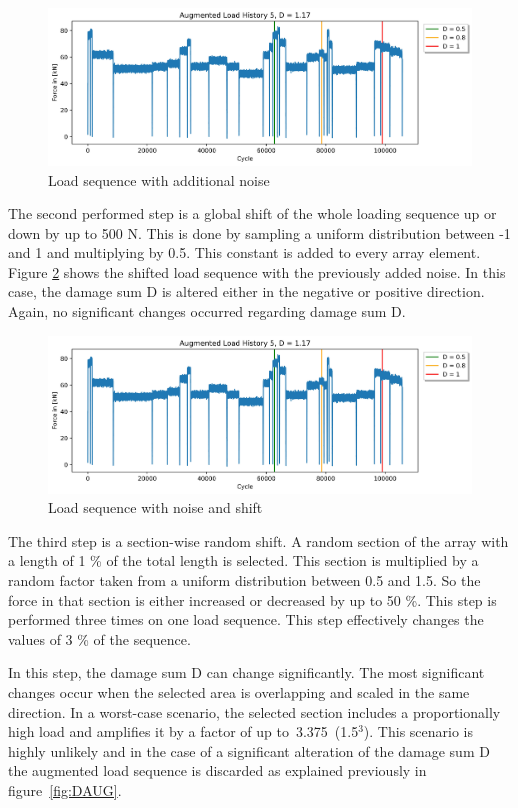 \begin{figure}[H]
	\centering
	\includegraphics[width=1\linewidth]{IMGs/Verlauf_5_noise.jpg}
	\caption{Load sequence with additional noise}
	\label{fig:V5_noise}
\end{figure}

The second performed step is a global shift of the whole loading sequence up or down by up to 500 N. This is done by sampling a uniform distribution between -1 and 1 and multiplying by 0.5. This constant is added to every array element. Figure \ref{fig:V5_shift} shows the shifted load sequence with the previously added noise. In this case, the damage sum D is altered either in the negative or positive direction. Again, no significant changes occurred regarding damage sum D.

\begin{figure}[H]
	\centering
	\includegraphics[width=1\linewidth]{IMGs/Verlauf_5_noise.jpg}
	\caption{Load sequence with noise and shift}
	\label{fig:V5_shift}
\end{figure}

The third step is a section-wise random shift. A random section of the array with a length of 1 \% of the total length is selected. This section is multiplied by a random factor taken from a uniform distribution between 0.5 and 1.5. So the force in that section is either increased or decreased by up to 50 \%. This step is performed three times on one load sequence. This step effectively changes the values of 3 \% of the sequence. 

In this step, the damage sum D can change significantly. The most significant changes occur when the selected area is overlapping and scaled in the same direction. In a worst-case scenario, the selected section includes a proportionally high load and amplifies it by a factor of up to~3.375~(1.5\(^3\)). This scenario is highly unlikely and in the case of a significant alteration of the damage sum D the augmented load sequence is discarded as explained previously in figure~\ref{fig:DAUG}.
 
